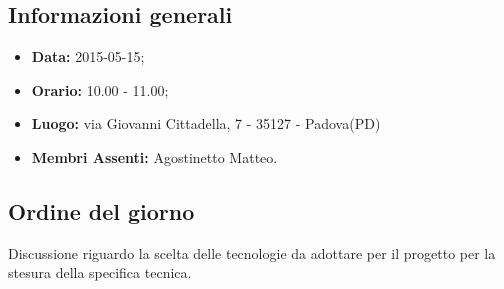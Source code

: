 \subsection{Informazioni generali}
\begin{itemize}
	\item \textbf{Data:} 2015-05-15;
	\item \textbf{Orario:} 10.00 - 11.00;
	\item \textbf{Luogo:} via Giovanni Cittadella, 7 - 35127 - Padova(PD)
	\item \textbf{Membri Assenti:} Agostinetto Matteo.
\end{itemize}

\subsection{Ordine del giorno}
Discussione riguardo la scelta delle tecnologie da adottare per il progetto per la stesura della specifica tecnica.

